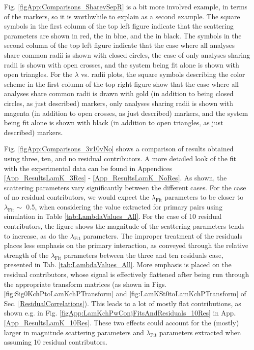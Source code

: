 \documentclass[/home/jesse/Analysis/FemtoAnalysis/AnalysisNotes/AnalysisNoteJBuxton.tex]{subfiles}
\begin{document}
Fig. \ref{figApp:Comparisons_SharevSepR} is a bit more involved example, in terms of the markers, so it is worthwhile to explain as a second example.
The square symbols in the first column of the top left figure indicate that the \LamKchP scattering parameters are shown in red, the \LamKchM in blue, and the \LamKs in black.
The symbols in the second column of the top left figure indicate that the case where all \LamK analyses share common radii is shown with closed circles, the case of only \LamKpm analyses sharing radii is shown with open crosses, and the \LamKs system being fit alone is shown with open triangles.
For the $\lambda$ vs. radii plots, the square symbols describing the color scheme in the first column of the top right figure show that the case where all \LamK analyses share common radii is drawn with gold (in addition to being closed circles, as just described) markers, only \LamKpm analyses sharing radii is shown with magenta (in addition to open crosses, as just described) markers, and the \LamKs system being fit alone is shown with black (in addition to open triangles, as just described) markers.

Fig. \ref{figApp:Comparisons_3v10vNo} shows a comparison of results obtained using three, ten, and no residual contributors.
A more detailed look of the fit with the experimental data can be found in Appendices \ref{App_ResultsLamK_3Res} - \ref{App_ResultsLamK_NoRes}.
As shown, the scattering parameters vary significantly between the different cases.
For the case of no residual contributors, we would expect the $\lambda_{\mathrm{Fit}}$ parameters to be closer to $\lambda_{\mathrm{Fit}} \sim$ 0.5, when considering the value extracted for primary pairs using simulation in Table \ref{tab:LambdaValues_All}.
For the case of 10 residual contributors, the figure shows the magnitude of the scattering parameters tends to increase, as do the $\lambda_{\mathrm{Fit}}$ parameters.
The improper treatment of the residuals places less emphasis on the primary interaction, as conveyed through the relative strength of the $\lambda_{\mathrm{Fit}}$ parameters between the three and ten residuals case, presented in Tab. \ref{tab:LambdaValues_All}.
More emphasis is placed on the residual contributors, whose signal is effectively flattened after being run through the appropriate transform matrices (as shown in Figs. \ref{fig:Sig0KchPtoLamKchPTransform} and \ref{fig:LamKSt0toLamKchPTransform} of Sec. \ref{ResidualCorrelations}).
This leads to a lot of mostly flat contributions, as shown e.g. in Fig. \ref{figApp:LamKchPwConjFitsAndResiduals_10Res} in App. \ref{App_ResultsLamK_10Res}.
These two effects could account for the (mostly) larger in magnitude scattering parameters and $\lambda_{\mathrm{Fit}}$ parameters extracted when assuming 10 residual contributors.
\end{document}
